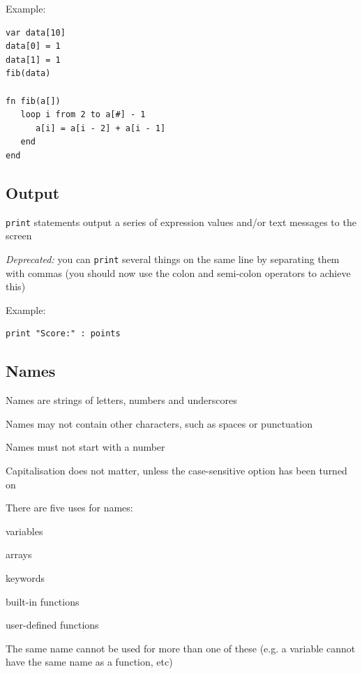 \documentclass[12pt,a4paper,twoside]{article}
\renewcommand{\_}{\texttt{\symbol{95}}}
\begin{document}
Example:
\begin{verbatim}
var data[10]
data[0] = 1
data[1] = 1
fib(data)

fn fib(a[])
   loop i from 2 to a[#] - 1
      a[i] = a[i - 2] + a[i - 1]
   end
end
\end{verbatim}

\subsection{Output}

\begin{bulletlist}
\item \verb^print^ statements output a series of expression values and/or
      text messages to the screen
\item \textit{Deprecated:} you can \verb^print^ several things on the same
		line by separating them with commas (you should now use the colon
		and semi-colon operators to achieve this)
\end{bulletlist}

Example:
\begin{verbatim}
print "Score:" : points
\end{verbatim}

\subsection{Names}

\begin{bulletlist}
\item Names are strings of letters, numbers and underscores
\item Names may not contain other characters, such as spaces or punctuation
\item Names must not start with a number
\item Capitalisation does not matter, unless the case-sensitive option
	has been turned on
\item There are five uses for names:
	\begin{bulletlist}
	\item variables
	\item arrays
	\item keywords
	\item built-in functions
	\item user-defined functions
	\end{bulletlist}
	The same name cannot be used for more than one of these
	(e.g. a variable cannot have the same name as a function, etc)
\end{bulletlist}
\end{document}
